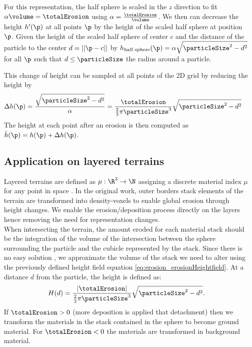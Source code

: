 For this representation, the half sphere is scaled in the $z$ direction to fit $\alpha \volume = \totalErosion$ using $\alpha = \frac{\totalErosion}{\volume}$. We then can decrease the height $h'(\p)$ at all points $\p$ by the height of the scaled half sphere at position $\p$. Given the height of the scaled half sphere of center $c$ and the distance of the particle to the center $d = ||\p - c||$ by $h_\text{half sphere}(\p) = \alpha \sqrt{\particleSize^2 - d^2}$ for all $\p$ such that $d \leq \particleSize$ the radius around a particle.

This change of height can be sampled at all points of the 2D grid by reducing the height by 
\begin{align} 
\label{eq:erosion_erosionHeightfield}
\Delta h(\p) &= \frac{\sqrt{\particleSize^2 - d^2}}{\alpha} = \frac{\totalErosion}{\frac{2}{3} \pi \particleSize^3} \sqrt{\particleSize^2 - d^2}
\end{align}
The height at each point after an erosion is then computed as $\Tilde{h}(\p) = h(\p) + \Delta h(\p)$.

\subsection{Application on layered terrains}
\label{sec:erosion_application_on_layers}
Layered terrains are defined as $\mu: \R^3 \to \N$ assigning a discrete material index $\mu$ for any point in space \cite{Benes2001, Peytavie2009b}. In the original work, outer borders stack elements of the terrain are transformed into density-voxels to enable global erosion through height changes. We enable the erosion/deposition process directly on the layers hence removing the need for representation changes. \\ 
When intersecting the terrain, the amount eroded for each material stack should be the integration of the volume of the intersection between the sphere surrounding the particle and the cubicle represented by the stack. Since there is no easy solution \cite{Jones2017}, we approximate the volume of the stack we need to alter using the previously defined height field equation \eqref{eq:erosion_erosionHeightfield}. 
At a distance $d$ from the particle, the height is defined as:
\begin{align} \label{eq:erosion_erosionLayers}
H(d) = \frac{|\totalErosion|}{\frac{2}{3} \pi \particleSize^3} \sqrt{\particleSize^2 - d^2}.
\end{align}
If $\totalErosion > 0$ (more deposition is applied that detachment) then we transform the materials in the stack contained in the sphere to become ground material. For $\totalErosion < 0$ the materials are transformed in background material.

